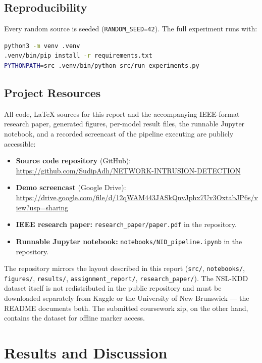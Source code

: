 \documentclass[11pt, a4paper]{article}
\begin{document}
\subsection{Reproducibility}
Every random source is seeded (\texttt{RANDOM\_SEED=42}). The full experiment runs with:
\begin{lstlisting}[language=bash, basicstyle=\ttfamily\small, numbers=none]
python3 -m venv .venv
.venv/bin/pip install -r requirements.txt
PYTHONPATH=src .venv/bin/python src/run_experiments.py
\end{lstlisting}

\subsection{Project Resources}
\label{sec:repo}
All code, LaTeX sources for this report and the accompanying IEEE-format research paper, generated figures, per-model result files, the runnable Jupyter notebook, and a recorded screencast of the pipeline executing are publicly accessible:

\begin{itemize}[leftmargin=2.2em]
    \item \textbf{Source code repository} (GitHub):\\
          \url{https://github.com/SudipAdh/NETWORK-INTRUSION-DETECTION}
    \item \textbf{Demo screencast} (Google Drive):\\
          \url{https://drive.google.com/file/d/12qWAM443JASkQnvJphx7Uv3OxtabJP6s/view?usp=sharing}
    \item \textbf{IEEE research paper:} \texttt{research\_paper/paper.pdf} in the repository.
    \item \textbf{Runnable Jupyter notebook:} \texttt{notebooks/NID\_pipeline.ipynb} in the repository.
\end{itemize}

The repository mirrors the layout described in this report (\texttt{src/}, \texttt{notebooks/}, \texttt{figures/}, \texttt{results/}, \texttt{assignment\_report/}, \texttt{research\_paper/}). The NSL-KDD dataset itself is not redistributed in the public repository and must be downloaded separately from Kaggle or the University of New Brunswick --- the README documents both. The submitted coursework zip, on the other hand, contains the dataset for offline marker access.

\section{Results and Discussion}
\label{sec:results}
\end{document}
